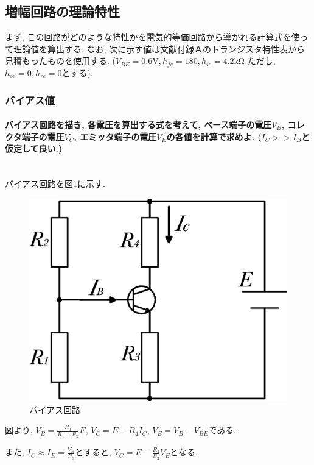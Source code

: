 \documentclass[titlepage]{jsarticle}
\begin{document}
    \subsection{増幅回路の理論特性}
        まず, この回路がどのような特性かを電気的等価回路から導かれる計算式を使って理論値を算出する.
        なお, 次に示す値は文献\cite{Text}付録Ａのトランジスタ特性表から見積もったものを使用する.
        ($V_{BE} = 0.6 \mathrm{V}, h_{fe} = 180, h_{ie} = 4.2 \mathrm{k\Omega}$ ただし, $h_{oe} = 0, h_{re} = 0$とする).

        \subsubsection{バイアス値} \label{sssec:bias}
            \paragraph{バイアス回路を描き, 各電圧を算出する式を考えて, ベース端子の電圧$V_B$, コレクタ端子の電圧$V_C$, エミッタ端子の電圧$V_E$の各値を計算で求めよ. ($I_C >> I_B$と仮定して良い.)}
            \mbox{} \\

                バイアス回路を図\ref{fig:bias}に示す.

                \begin{figure}[h]
                    \centering
                    \includegraphics[width=0.6\hsize]{images/bias.eps}
                    \caption{バイアス回路}
                    \label{fig:bias}
                \end{figure}

                図より, $\displaystyle V_B = \frac{R_1}{R_1 + R_2} E$,
                $\displaystyle V_C = E - R_4I_C$,
                $V_E = V_B - V_{BE}$である.

                また, $\displaystyle I_C \approx I_E = \frac{V_E}{R_3}$とすると,
                $\displaystyle V_C = E - \frac{R_4}{R_3} V_E$となる.
\end{document}
